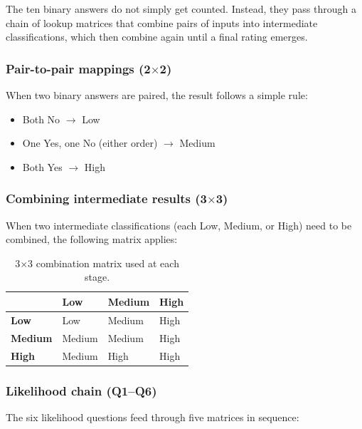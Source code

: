 The ten binary answers do not simply get counted. Instead, they pass through a chain of lookup matrices that combine pairs of inputs into intermediate classifications, which then combine again until a final rating emerges.

\subsubsection*{Pair-to-pair mappings (2$\times$2)}

When two binary answers are paired, the result follows a simple rule:

\begin{itemize}
\item Both No $\rightarrow$ Low
\item One Yes, one No (either order) $\rightarrow$ Medium
\item Both Yes $\rightarrow$ High
\end{itemize}

\subsubsection*{Combining intermediate results (3$\times$3)}

When two intermediate classifications (each Low, Medium, or High) need to be combined, the following matrix applies:

\begin{table}[H]
\centering
\begin{tabular}{|l|l|l|l|}
\hline
\rowcolor{gray!20}  & \textbf{Low} & \textbf{Medium} & \textbf{High} \\
\hline
\textbf{Low} & Low & Medium & High \\
\hline
\textbf{Medium} & Medium & Medium & High \\
\hline
\textbf{High} & Medium & High & High \\
\hline
\end{tabular}
\caption{3$\times$3 combination matrix used at each stage.}
\end{table}

\subsubsection*{Likelihood chain (Q1--Q6)}

The six likelihood questions feed through five matrices in sequence:

